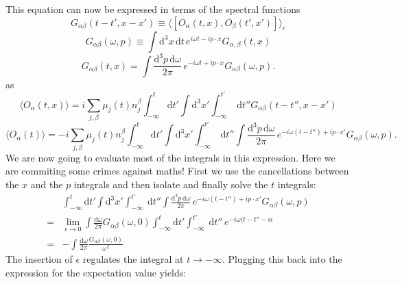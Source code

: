 \documentclass[master,       %
               twoside,        %
               BCOR10mm,       %
               english,ngerman, %
               ]{GAUBM}
\begin{document}
\begin{otherlanguage}{english}
\begin{equation}
\end{equation}
This equation can now be expressed in terms of the spectral functions
\begin{equation}
	G_{\alpha \beta}(t - t', x - x') \equiv \langle [ O_\alpha(t, x), O_\beta(t', x')] \rangle_{c}
\end{equation}
\begin{equation}G_{\alpha \beta}(\omega, p) \equiv \int \mathrm{d}^3 x \, \mathrm{d} t \, e^{i \omega t - i p \cdot x} G_{\alpha, \beta}(t, x)
\end{equation}
\begin{equation}G_{\alpha \beta}(t, x) = \int \frac{\mathrm{d}^3 p \, \mathrm{d} \omega}{2 \pi} \, e^{- i \omega t + i p \cdot x} G_{\alpha \beta}(\omega, p).
\end{equation}
as
\begin{equation}
	\langle O_\alpha(t, x) \rangle = i \sum_{j, \beta} \mu_j(t) n^\beta_j  \int_{-\infty}^t \mathrm{d} t' \int \mathrm{d}^3 x' \int^{t'}_{-\infty} \ \mathrm{d} t'' G_{\alpha \beta}(t - t'', x - x')
\end{equation}
\begin{equation}
	\langle O_\alpha(t) \rangle = - i \sum_{j, \beta} \mu_j(t) n^\beta_j  \int_{-\infty}^t \mathrm{d} t' \int \mathrm{d}^3 x' \int^{t'}_{-\infty} \ \mathrm{d} t''
	\int \frac{\mathrm{d}^3 p \, \mathrm{d} \omega}{2 \pi} \, e^{- i \omega (t - t'') + i p \cdot x'} G_{\alpha \beta}(\omega, p).
\end{equation}
We are now going to evaluate most of the integrals in this expression. Here we are commiting some crimes against maths! First we use the cancellations between the $x$ and the $p$ integrals and then isolate and finally solve the $t$ integrals:
\begin{align}
	& \int_{-\infty}^t \mathrm{d} t' \int \mathrm{d}^3 x' \int^{t'}_{-\infty} \ \mathrm{d} t''
	\int \frac{\mathrm{d}^3 p \, \mathrm{d} \omega}{2 \pi} \, e^{- i \omega (t - t'') + i p \cdot x'} G_{\alpha \beta}(\omega, p) \nonumber \\
	= & \lim_{\epsilon \to 0} \int \frac{\mathrm{d} \omega}{2 \pi} G_{\alpha \beta}(\omega, 0) \int_{-\infty}^t \mathrm{d} t' \int^{t'}_{-\infty} \ \mathrm{d} t''
	\, e^{- i \omega (t - t'' - i \epsilon}  \nonumber \\
	= & - \int \frac{\mathrm{d} \omega}{2 \pi} \frac{G_{\alpha \beta}(\omega, 0)} {\omega^2}
\end{align}
The insertion of $\epsilon$ regulates the integral at $t \to - \infty$.
Plugging this back into the expression for the expectation value yields:

\end{otherlanguage}
\end{document}
